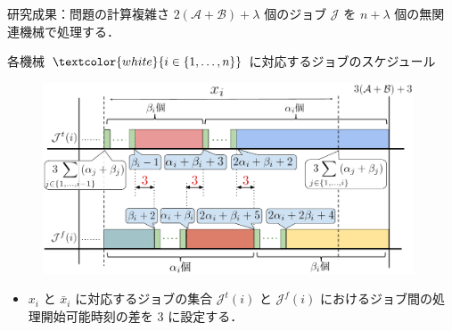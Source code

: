 \documentclass[dvipdfmx]{beamer}
\begin{document}

    \begin{frame}{研究成果：問題の計算複雑さ}
      $2(\mathcal{A} + \mathcal{B}) + \lambda$ 個のジョブ $\mathcal{J}$ を $n + \lambda$ 個の無関連機械で処理する．
      \begin{block}{各機械 ${\textcolor{white}{i \in \{1,\ldots,n\}}}$ に対応するジョブのスケジュール}
        \begin{figure}[h]
          \centering
          \includegraphics[width = 11cm]{figure/3SAT4.pdf}
        \end{figure}
      \end{block}
      \begin{itemize}
        \item $x_i$ と $\bar x_i$ に対応するジョブの集合 $\mathcal{J}^t(i)$ と $\mathcal{J}^f(i)$ におけるジョブ間の処理開始可能時刻の差を $3$ に設定する．
      \end{itemize}
    \end{frame}
\end{document}
